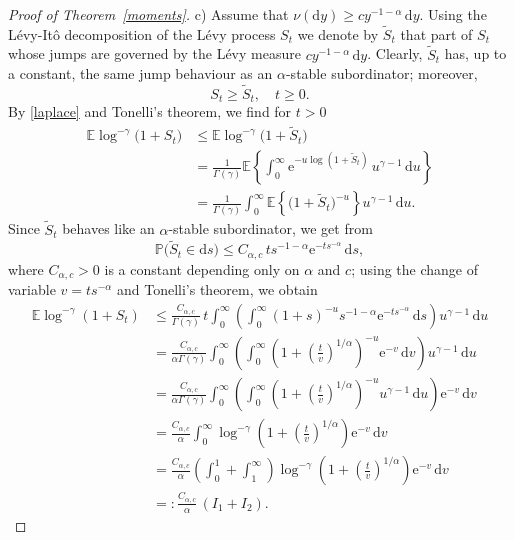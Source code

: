 \documentclass{aptpub}
\newcommand\EE{\mathds E}
\newcommand\Prob{\mathds P}
\newcommand\dup{\mathrm{d}}
\newcommand\eup{\mathrm{e}}                                %
\numberwithin{equation}{section}
\begin{document}
\begin{proof}[Proof of Theorem~\ref{moments}]
\medskip\noindent c)
Assume that $\nu(\dup y)\geq cy^{-1-\alpha}\,\dup y$. Using the L\'evy-It\^o decomposition of the L\'evy process $S_t$ we denote by $\widetilde S_t$ that part of $S_t$ whose jumps are governed by the L\'evy measure $cy^{-1-\alpha}\,\dup y$. Clearly, $\widetilde S_t$ has, up to a constant, the same jump behaviour as an $\alpha$-stable subordinator; moreover,
$$
    S_t\geq \widetilde{S}_t,\quad t\geq 0.
$$
By \eqref{laplace} and Tonelli's theorem, we find for $t>0$
\begin{align*}
    \EE\log^{-\gamma}\big(1+S_t\big)
    &\leq \EE\log^{-\gamma}\big(1+\widetilde{S}_t\big)\\
    &= \frac{1}{\Gamma(\gamma)}\EE\left\{ \int_0^\infty\eup^{-u\log\left(1+\widetilde{S}_t\right)}\,u^{\gamma-1}\,\dup u\right\}\\
    &=\frac{1}{\Gamma(\gamma)}\int_0^\infty \EE\left\{\big(1+\widetilde{S}_t\big)^{-u}\right\} u^{\gamma-1}\,\dup u.
\end{align*}
Since $\widetilde S_t$ behaves like an $\alpha$-stable subordinator, we get from \cite[(14)]{BSS03}
$$
    \Prob\big(\widetilde{S}_t\in\dup s\big)
    \leq C_{\alpha,c}\, ts^{-1-\alpha} \eup^{-ts^{-\alpha}}\,\dup s,
$$
where $C_{\alpha,c}>0$ is a constant depending only on $\alpha$ and $c$; using the change of variable $v=ts^{-\alpha}$ and Tonelli's theorem, we obtain
\begin{align*}
    \EE\log^{-\gamma}(1+S_t)
    &\leq \frac{C_{\alpha,c}}{\Gamma(\gamma)} \,t\int_0^\infty\left( \int_0^\infty(1+s)^{-u}s^{-1-\alpha} \eup^{-ts^{-\alpha}}\,\dup s \right)
    u^{\gamma-1}\,\dup u\\
    &= \frac{C_{\alpha,c}}{\alpha\Gamma(\gamma)} \int_0^\infty\left( \int_0^\infty\left(1+\left(\tfrac tv\right)^{1/\alpha} \right)^{-u}\eup^{-v}\,\dup v\right)
            u^{\gamma-1}\,\dup u\\
    &=\frac{C_{\alpha,c}}{\alpha\Gamma(\gamma)} \int_0^\infty\left( \int_0^\infty\left(1+\left(\tfrac tv\right)^{1/\alpha} \right)^{-u}
            u^{\gamma-1}\,\dup u\right) \eup^{-v}\,\dup v\\
    &=\frac{C_{\alpha,c}}{\alpha} \int_0^\infty
    \log^{-\gamma}\left(1+\left(\tfrac tv\right)^{1/\alpha}\right)
    \eup^{-v}\,\dup v\\
    &=\frac{C_{\alpha,c}}{\alpha}\left(\int_0^1
    +\int_1^\infty\right)
    \log^{-\gamma}\left(1+\left(\tfrac tv\right)^{1/\alpha}\right)
    \eup^{-v}\,\dup v\\
    &=:\frac{C_{\alpha,c}}{\alpha}\,(I_1+I_2).
\end{align*}

\end{proof}
\end{document}
